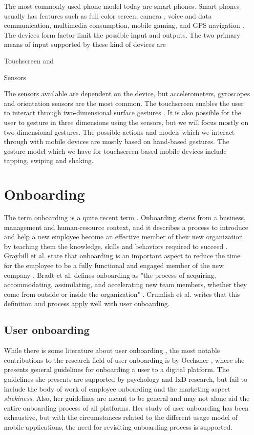 The most commonly used phone model today are smart phones. Smart phones usually has features such as full color screen, camera \cite{Yu2012}, voice and data communication, multimedia consumption, mobile gaming, and GPS navigation \cite{Ruiz2011}. The devices form factor limit the possible input and outputs. The two primary means of input supported by these kind of devices are
\begin{enumerate*}[label=(\(\arabic*\))]
  \item Touchscreen and
  \item Sensors
\end{enumerate*}

The sensors available are dependent on the device, but accelerometers, gyroscopes and orientation sensors are the most common. The touchscreen enables the user to interact through two-dimensional surface gestures \cite{Ruiz2011}. It is also possible for the user to gesture in three dimensions using the sensors, but we will focus mostly on two-dimensional gestures. The possible actions and models which we interact through with mobile devices are mostly based on hand-based gestures. The gesture model which we have for touchscreen-based mobile devices include tapping, swiping and shaking.

\section{Onboarding}
The term onboarding is a quite recent term \cite{Dai2007}. Onboarding stems from a business, management and human-resource context, and it describes a process to introduce and help a new employee become an effective member of their new organization by teaching them the knowledge, skills and behaviors required to succeed \cite{Bauer2011}. Graybill et al. state that onboarding is an important aspect to reduce the time for the employee to be a fully functional and engaged member of the new company \cite{GraybillJolieO;HudsonCarpenterMariaTaesil;OffordJeromeJr;PiorunMary;Shaffer2013}. Bradt et al. defines onboarding as "the process of acquiring, accommodating, assimilating, and accelerating new team members, whether they come from outside or inside the organization" \cite{Bradt2009}. Crumlish et al. \cite{Crumlish2009} writes that this definition and process apply well with user onboarding.

\subsection{User onboarding}
While there is some literature about user onboarding \cite{Thomsen2016}, the most notable contributions to the research field of user onboarding is by Oechsner \cite{Oechsner2016}, where she presents general guidelines for onboarding a user to a digital platform. The guidelines she presents are supported by psychology and IxD research, but fail to include the body of work of employee onboarding and the marketing aspect \textit{stickiness}. Also, her guidelines are meant to be general and may not alone aid the entire onboarding process of all platforms. Her study of user onboarding has been exhaustive, but with the circumstances related to the different usage model of mobile applications, the need for revisiting onboarding process is supported.
